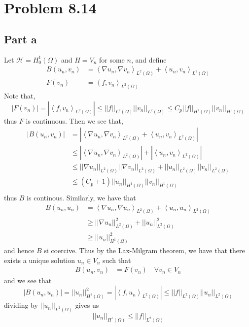 \documentclass[12pt]{report}
\newcommand{\norm}[1]{\left|\left|#1\right|\right|}
\newcommand{\inner}[2]{\left\langle#1,#2\right\rangle}
\begin{document}
\maketitle

\section*{Problem 8.14}
\subsection*{Part a}
Let $\mathcal{H} = H_0^1(\Omega)$ and $H = V_n$ for some $n$, and define
\begin{align*}
  B(u_n,v_n) &= \inner{\nabla u_n}{\nabla v_n}_{L^2(\Omega)} + \inner{u_n}{v_n}_{L^2(\Omega)}\\
  F(v_n) &= \inner{f}{v_n}_{L^2(\Omega)}
\end{align*}
Note that,
\begin{equation*}
  |F(v_n)| = \left|\inner{f}{v_n}_{L^2(\Omega)}\right| \leq \norm{f}_{L^2(\Omega)} \norm{v_n}_{L^2(\Omega)} \leq C_p \norm{f}_{H^1(\Omega)} \norm{v_n}_{H^1(\Omega)}
\end{equation*}
thus $F$ is continuous. Then we see that,
\begin{align*}
|B(u_n,v_n)| &= \left|\inner{\nabla u_n}{\nabla v_n}_{L^2(\Omega)} + \inner{u_n}{v_n}_{L^2(\Omega)}\right| \\
             &\leq \left|\inner{\nabla u_n}{\nabla v_n}_{L^2(\Omega)}\right| + \left|\inner{u_n}{v_n}_{L^2(\Omega)}\right| \\
             &\leq \norm{\nabla u_n}_{L^2(\Omega)} \norm{\nabla v_n}_{L^2(\Omega)} + \norm{u_n}_{L^2(\Omega)} \norm{v_n}_{L^2(\Omega)}\\
             &\leq (C_p + 1) \norm{u_n}_{H^1(\Omega)} \norm{v_n}_{H^1(\Omega)}\\
\end{align*}
thus $B$ is continous. Similarly, we have that 
\begin{align*}
  B(u_n,u_n) &= \inner{\nabla u_n}{\nabla u_n}_{L^2(\Omega)} + \inner{u_n}{u_n}_{L^2(\Omega)}\\
  &\geq \norm{\nabla u_n}_{L^2(\Omega)}^2 + \norm{u_n}_{L^2(\Omega)}^2\\
  &\geq  \norm{u_n}_{H^1(\Omega)}^2
\end{align*}
and hence $B$ si coercive. Thus by the Lax-Milgram theorem, we have that there exists a unique solution $u_n \in V_n$ such that
\begin{align*}
  B(u_n,v_n) &= F(v_n) \quad \forall v_n \in V_n
\end{align*}
and we see that
\begin{equation*}
|B(u_n,u_n)| = \norm{u_n}_{H^1(\Omega)}^2 = |\inner{f}{u_n}_{L^2(\Omega)}| \leq \norm{f}_{L^2(\Omega)} \norm{u_n}_{L^2(\Omega)} 
\end{equation*}
dividing by $\norm{u_n}_{L^2(\Omega)}$ gives us
\begin{equation*}
  \norm{u_n}_{H^1(\Omega)} \leq \norm{f}_{L^2(\Omega)} 
\end{equation*}
\end{document}
